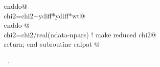 \documentclass[10pt,a4paper,notitlepage]{article}
\begin{document}
\begin{flushleft}
\begin{minipage}{\linewidth}
\begin{list}{}{}
\mbox{}\verb@        enddo@\\
\mbox{}\verb@        chi2=chi2+ydiff*ydiff*wt@\\
\mbox{}\verb@      enddo               @\\
\mbox{}\verb@      chi2=chi2/real(ndata-npars) ! make reduced chi2@\\
\mbox{}\verb@      return; end subroutine calpat                                       @{\NWsep}
\end{list}
\vspace{-1.5ex}
\footnotesize
\begin{list}{}{\setlength{\itemsep}{-\parsep}\setlength{\itemindent}{-\leftmargin}}
\item \NWtxtMacroRefIn\ .

\item{}
\end{list}
\end{minipage}\vspace{4ex}
\end{flushleft}
\end{document}
